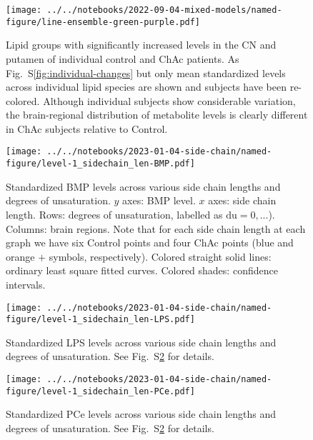 \documentclass[letterpaper]{article}
\begin{document}
\begin{figure}[p]
\begin{center}
	\texttt{[image: ../../notebooks/2022-09-04-mixed-models/named-figure/line-ensemble-green-purple.pdf]}
\end{center}
	\caption[Significant lipid changes in individual control and ChAc patients II.]{
		Lipid groups with significantly increased levels in the CN and putamen of
		individual control and ChAc patients. As Fig.~S\ref{fig:individual-changes} but only mean standardized levels across
		individual lipid species are shown and subjects have been re-colored.
		Although individual subjects show considerable variation, the
		brain-regional distribution of metabolite levels is clearly different in ChAc subjects
		relative to Control.
}
\label{fig:individual-changes-simple}
\end{figure}

\begin{figure}[p]
	\texttt{[image: ../../notebooks/2023-01-04-side-chain/named-figure/level-1\_sidechain\_len-BMP.pdf]}
	\caption[BMP levels across various side chain lengths and degrees of unsaturation]{
		Standardized BMP levels across various side chain lengths and degrees of unsaturation.
		$y$ axes: BMP level. $x$ axes: side chain length. Rows: 
		degrees of unsaturation, labelled as $\mathrm{du} = 0,...$). Columns:
		brain regions.
		Note that for each side chain length at each
		graph we have six Control points and four ChAc points (blue and orange $+$
		symbols, respectively).  Colored straight solid lines: ordinary
		least square fitted curves.  Colored shades: confidence intervals.
}
\label{fig:sidechain-BMP}
\end{figure}


\begin{figure}[p]
	\texttt{[image: ../../notebooks/2023-01-04-side-chain/named-figure/level-1\_sidechain\_len-LPS.pdf]}
	\caption[LPS levels across various side chain lengths and degrees of unsaturation]{
		Standardized LPS levels across various side chain lengths and degrees of unsaturation.
		See Fig.~S\ref{fig:sidechain-BMP} for details.
}
\label{fig:sidechain-LPS}
\end{figure}


\begin{figure}[p]
	\texttt{[image: ../../notebooks/2023-01-04-side-chain/named-figure/level-1\_sidechain\_len-PCe.pdf]}
	\caption[PCe levels across various side chain lengths and degrees of unsaturation]{
		Standardized PCe levels across various side chain lengths and degrees of unsaturation.
		See Fig.~S\ref{fig:sidechain-BMP} for details.
}
\label{fig:sidechain-PCe}
\end{figure}
\end{document}

